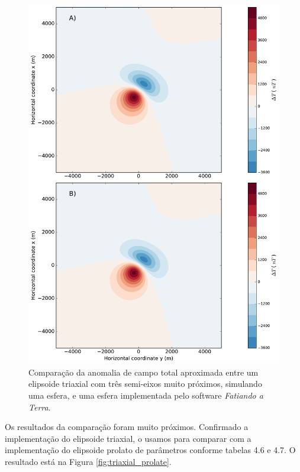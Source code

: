 \begin{figure}[hbt!]
	\centering \includegraphics[width=14.5 cm,height=22 cm]{figures/ellipsoid_triaxial_sphere}
	\caption[Comparação da anomalia de campo total aproximada entre um elipsoide triaxial com três semi-eixos muito próximos, simulando uma esfera, 
	e uma esfera.]{Comparação da anomalia de campo total aproximada entre um elipsoide triaxial com três semi-eixos muito próximos, simulando uma esfera, e uma esfera implementada pelo software \textit{Fatiando a Terra}.}
	\label{fig:triaxial_sphere}
\end{figure}

Os resultados da comparação foram muito próximos. Confirmado a implementação do elipsoide triaxial, o usamos para comparar com a implementação do elipsoide prolato de parâmetros conforme tabelas 4.6 e 4.7. O resultado está na Figura \ref{fig:triaxial_prolate}.

